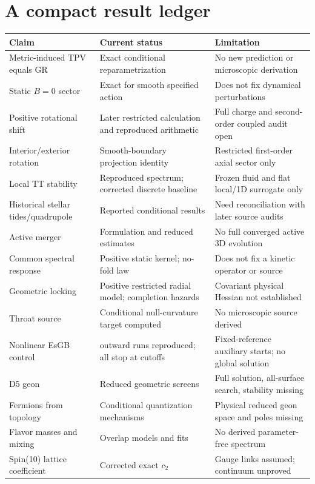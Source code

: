 \documentclass[11pt,oneside]{report}
\begin{document}
\section{A compact result ledger}
\begin{longtable}{>{\raggedright\arraybackslash}p{}>{\raggedright\arraybackslash}p{}>{\raggedright\arraybackslash}p{}}
\toprule Claim & Current status & Limitation\\\midrule\endhead
Metric-induced TPV equals GR & Exact conditional reparametrization & No new prediction or microscopic derivation\\
Static $B=0$ sector & Exact for smooth specified action & Does not fix dynamical perturbations\\
Positive rotational shift & Later restricted calculation and reproduced arithmetic & Full charge and second-order coupled audit open\\
Interior/exterior rotation & Smooth-boundary projection identity & Restricted first-order axial sector only\\
Local TT stability & Reproduced spectrum; corrected discrete baseline & Frozen fluid and flat local/1D surrogate only\\
Historical stellar tides/quadrupole & Reported conditional results & Need reconciliation with later source audits\\
Active merger & Formulation and reduced estimates & No full converged active 3D evolution\\
Common spectral response & Positive static kernel; no-fold law & Does not fix a kinetic operator or source\\
Geometric locking & Positive restricted radial model; completion hazards & Covariant physical Hessian not established\\
Throat source & Conditional null-curvature target computed & No microscopic source derived\\
Nonlinear EsGB control & 30 outward runs reproduced; all stop at cutoffs & Fixed-reference auxiliary starts; no global solution\\
D5 geon & Reduced geometric screens & Full solution, all-surface search, stability missing\\
Fermions from topology & Conditional quantization mechanisms & Physical reduced geon space and poles missing\\
Flavor masses and mixing & Overlap models and fits & No derived parameter-free spectrum\\
Spin(10) lattice coefficient & Corrected exact $c_2$ & Gauge links assumed; continuum unproved\\

\end{longtable}
\end{document}

